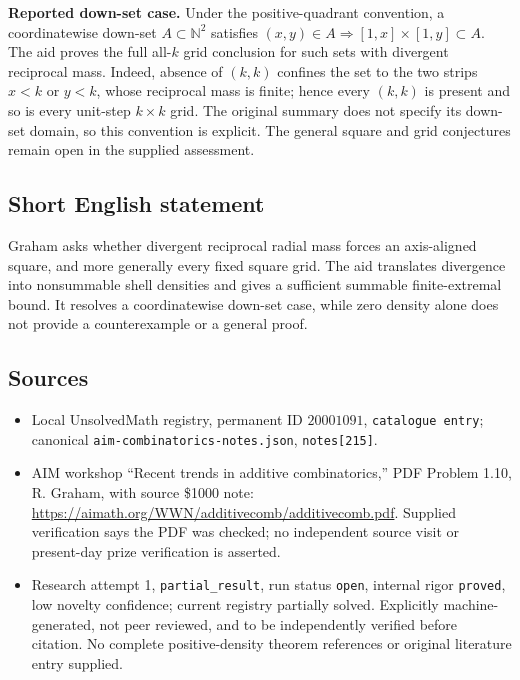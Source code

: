 \documentclass[11pt]{article}
\newcommand{\N}{\mathbb{N}}
\begin{document}
\textbf{Reported down-set case.} Under the positive-quadrant convention, a coordinatewise down-set $A\subset\N^2$ satisfies $(x,y)\in A\Rightarrow[1,x]\times[1,y]\subset A$. The aid proves the full all-$k$ grid conclusion for such sets with divergent reciprocal mass. Indeed, absence of $(k,k)$ confines the set to the two strips $x<k$ or $y<k$, whose reciprocal mass is finite; hence every $(k,k)$ is present and so is every unit-step $k\times k$ grid. The original summary does not specify its down-set domain, so this convention is explicit. The general square and grid conjectures remain open in the supplied assessment.
\subsection{Short English statement}
Graham asks whether divergent reciprocal radial mass forces an axis-aligned square, and more generally every fixed square grid. The aid translates divergence into nonsummable shell densities and gives a sufficient summable finite-extremal bound. It resolves a coordinatewise down-set case, while zero density alone does not provide a counterexample or a general proof.
\subsection{Sources}
\begin{itemize}
\item Local UnsolvedMath registry, permanent ID $20001091$, \texttt{catalogue entry}; canonical \texttt{aim-combinatorics-notes.json}, \texttt{notes[215]}.
\item AIM workshop ``Recent trends in additive combinatorics,'' PDF Problem 1.10, R. Graham, with source \$1000 note: \url{https://aimath.org/WWN/additivecomb/additivecomb.pdf}. Supplied verification says the PDF was checked; no independent source visit or present-day prize verification is asserted.
\item Research attempt 1, \texttt{partial\_result}, run status \texttt{open}, internal rigor \texttt{proved}, low novelty confidence; current registry partially solved. Explicitly machine-generated, not peer reviewed, and to be independently verified before citation. No complete positive-density theorem references or original literature entry supplied.
\end{itemize}
\end{document}
